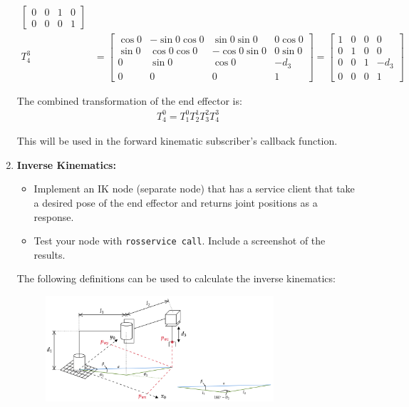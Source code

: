 \documentclass[10pt]{article}
\begin{document}
\begin{enumerate}
\begin{align*}
\begin{bmatrix}
		0 & 0 & 1 & 0 \\
		0 & 0 & 0 & 1
		\end{bmatrix}
		\\
		T_{4}^3 &= \begin{bmatrix}
		\cos 0 & -\sin 0 \cos 0 &\sin 0 \sin 0 & 0 \cos 0 \\
		\sin 0 & \cos 0 \cos 0 & -\cos 0 \sin 0 & 0 \sin 0 \\
		0 & \sin 0 & \cos 0 & -d_3 \\
		0 & 0 & 0 & 1
		\end{bmatrix} = \begin{bmatrix}
		1 & 0 & 0 & 0 \\
		0 & 1 & 0 & 0 \\
		0 & 0 & 1 & -d_3 \\
		0 & 0 & 0 & 1
		\end{bmatrix}
	\end{align*}
	
	The combined transformation of the end effector is:
	\begin{align*}
		T_4^0 = T_1^0 T_2^1 T_3^2 T_4^3
	\end{align*}
	
	This will be used in the forward kinematic subscriber's callback function.
	
	\item \textbf{Inverse Kinematics:}
	
	\begin{itemize}
		\item Implement an IK node (separate node) that has a service client that take a desired pose of the end effector and returns joint positions as a response.
	
		\item Test your node with \texttt{rosservice call}. Include a screenshot of the results.
	\end{itemize}

	The following definitions can be used to calculate the inverse kinematics:
	\begin{figure}[h]
		\centering
		\includegraphics[width=0.8\textwidth]{figures/rrp_IK.png}
	\end{figure}
	
\end{enumerate}
\end{document}

